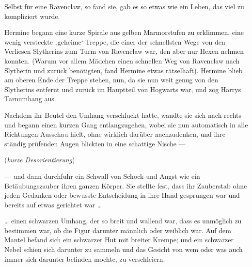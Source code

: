 Selbst für eine Ravenclaw, so fand sie, gab es so etwas wie ein Leben, das viel zu kompliziert wurde.

Hermine begann eine kurze Spirale aus gelben Marmorstufen zu erklimmen, eine wenig versteckte ‚geheime‘ Treppe, die einer der schnellsten Wege von den Verliesen Slytherins zum Turm von Ravenclaw war, den aber nur Hexen nehmen konnten. (Warum vor allem Mädchen einen schnellen Weg von Ravenclaw nach Slytherin und zurück benötigten, fand Hermine etwas rätselhaft). Hermine blieb am oberen Ende der Treppe stehen, nun, da sie nun weit genug von den Slytherins entfernt und zurück im Hauptteil von Hogwarts war, und zog Harrys Tarnumhang aus.

Nachdem ihr Beutel den Umhang verschluckt hatte, wandte sie sich nach rechts und begann einen kurzen Gang entlangzugehen, wobei sie nun automatisch in alle Richtungen Ausschau hielt, ohne wirklich darüber nachzudenken, und ihre ständig prüfenden Augen blickten in eine schattige Nische —

(\emph{kurze Desorientierung})

— und dann durchfuhr ein Schwall von Schock und Angst wie ein Betäubungszauber ihren ganzen Körper. Sie stellte fest, dass ihr Zauberstab ohne jeden Gedanken oder bewusste Entscheidung in ihre Hand gesprungen war und bereits auf etwas gerichtet war …

… einen schwarzen Umhang, der so breit und wallend war, dass es unmöglich zu bestimmen war, ob die Figur darunter männlich oder weiblich war. Auf dem Mantel befand sich ein schwarzer Hut mit breiter Krempe; und ein schwarzer Nebel schien sich darunter zu sammeln und das Gesicht von wem oder was auch immer sich darunter befinden mochte, zu verschleiern.

